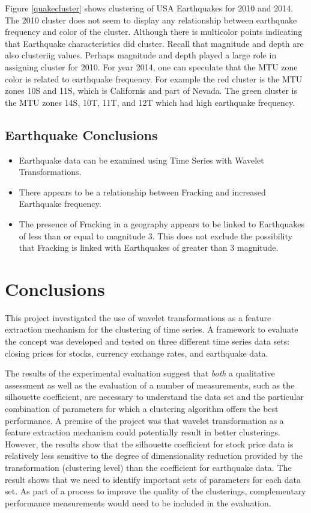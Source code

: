 \documentclass{article}
\begin{document}
Figure \ref{quakecluster} shows clustering of USA Earthquakes for 2010 and 2014.  The 2010 cluster does not seem to display any relationship between earthquake frequency and color of the cluster.
Although there is multicolor points indicating that Earthquake characteristics did cluster.  Recall that magnitude and depth are also clusteriig values.  Perhaps magnitude and depth played a large role in assigning cluster for 2010.
For year 2014, one can speculate that the MTU zone color is related to earthquake frequency.  For example the red cluster is the MTU zones 10S and 11S, which is Californis and part of Nevada.
The green cluster is the MTU zones 14S, 10T, 11T, and 12T which had high earthquake frequency.
\subsection{Earthquake Conclusions}

\begin{itemize}
\item Earthquake data can be examined using Time Series with Wavelet Transformations.
\item There appears to be a relationship between Fracking and increased Earthquake frequency.
\item The presence of Fracking in a geography appears to be linked to Earthquakes of less than or equal to  magnitude 3. This does not exclude the possibility that Fracking is linked with Earthquakes of  greater than 3 magnitude.
\end{itemize}


\section{Conclusions}

This project investigated the use of wavelet transformations as a feature extraction mechanism for the clustering of time series. A framework to evaluate the concept was developed and tested on three different time series data sets: closing prices for stocks, currency exchange rates, and earthquake data.

The results of the experimental evaluation suggest that {\em both} a qualitative assessment as well as the evaluation of a number of measurements, such as the silhouette coefficient, are necessary to understand the data set and the particular combination of parameters for which a clustering algorithm offers the best performance. A premise of the project was that wavelet transformation as a feature extraction mechanism could potentially result in better clusterings. However, the results show that the silhouette coefficient for stock price data is relatively less sensitive to the degree of dimensionality reduction provided by the transformation (clustering level) than the coefficient for earthquake data. The result shows that we need to identify important sets of parameters for each data set. As part of a process to improve the quality of the clusterings, complementary performance measurements would need to be included in the evaluation.
\end{document}
